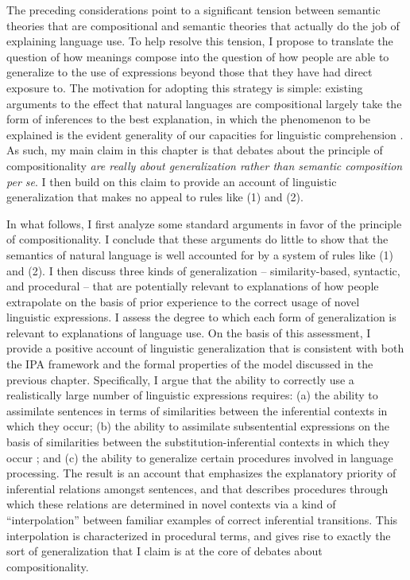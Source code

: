The preceding considerations point to a significant tension between semantic theories that are compositional and semantic theories that actually do the job of explaining language use. To help resolve this tension, I propose to translate the question of how meanings compose into the question of how people are able to generalize to the use of expressions beyond those that they have had direct exposure to. The motivation for adopting this strategy is simple: existing arguments to the effect that natural languages are compositional largely take the form of inferences to the best explanation, in which the phenomenon to be explained is the evident generality of our capacities for linguistic comprehension \citep{Szabo:2013,Szabo:2012}. As such, my main claim in this chapter is that debates about the principle of compositionality \textit{are really about generalization rather than semantic composition per se}. I then build on this claim to provide an account of linguistic generalization that makes no appeal to rules like (1) and (2).

In what follows, I first analyze some standard arguments in favor of the principle of compositionality. I conclude that these arguments do little to show that the semantics of natural language is well accounted for by a system of rules like (1) and (2). I then discuss three kinds of generalization -- similarity-based, syntactic, and procedural -- that are potentially relevant to explanations of how people extrapolate on the basis of prior experience to the correct usage of novel linguistic expressions. I assess the degree to which each form of generalization is relevant to explanations of language use. On the basis of this assessment, I provide a positive account of linguistic generalization that is consistent with both the IPA framework and the formal properties of the model discussed in the previous chapter. Specifically, I argue that the ability to correctly use a realistically large number of linguistic expressions requires: (a) the ability to assimilate sentences in terms of similarities between the inferential contexts in which they occur; (b) the ability to assimilate subsentential expressions on the basis of similarities between the substitution-inferential contexts in which they occur \citep{Brandom:1994}; and (c) the ability to generalize certain procedures involved in language processing. The result is an account that emphasizes the explanatory priority of inferential relations amongst sentences, and that describes procedures through which these relations are determined in novel contexts via a kind of ``interpolation'' between familiar examples of correct inferential transitions. This interpolation is characterized in procedural terms, and gives rise to exactly the sort of generalization that I claim is at the core of debates about compositionality.

